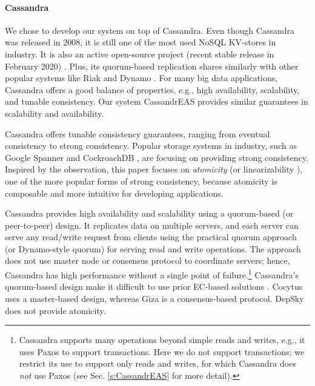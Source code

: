 \paragraph*{Cassandra}

We chose to develop our system on top of Cassandra. Even though Cassandra was released in 2008, it is still one of the most used NoSQL KV-stores in industry. It is also an active open-source project (recent stable release in February 2020) \cite{DBEnginesCassandra}. Plus, its quorum-based replication \cite{pbs-vldb2012} shares similarly with other popular systems like Riak \cite{Riak} and Dynamo \cite{Dynamo}. For many big data applications, Cassandra offers a good balance of properties, e.g., high availability, scalability, and tunable consistency. Our system CassandrEAS provides similar guarantees in scalability and availability.%


Cassandra offers tunable consistency guarantees, ranging from eventual consistency to strong consistency.
Popular storage systems in industry, such as Google Spanner \cite{Spanner} and CockroachDB \cite{cockroachDB}, are focusing on providing strong consistency. 
Inspired by the observation, this paper focuses on \textit{atomicity} \cite{lamport} (or linearizability \cite{herlihy1990linearizability}), one of the more popular forms of strong consistency, because atomicity is composable \cite{herlihy1990linearizability} and more intuitive for developing applications.


Cassandra provides high availability and scalability using a quorum-based (or peer-to-peer) design.
It replicates data on multiple servers, and each server can serve any read/write request from clients 
using the practical quorum approach (or Dynamo-style quorum) \cite{pbs-vldb2012} for serving read and write operations. 
The approach does not use master node or consensus protocol to coordinate servers; hence, Cassandra has high performance without a single point of failure.\footnote{Cassandra  supports many operations beyond simple reads and writes, e.g., it uses Paxos \cite{paxos} to support transactions. Here we do not support transactions; we restrict its use to support only reads and writes, for which Cassandra does \textit{not} use Paxos (see Sec. \ref{s:CassandrEAS} for more detail).}  
Cassandra's quorum-based design make it difficult to use prior EC-based solutions \cite{Cocytus2016,GIZA2017,DepSky13}. Cocytus \cite{Cocytus2016} uses a master-based design, whereas Giza \cite{GIZA2017} is a consensus-based protocol. DepSky  \cite{DepSky13} does not provide atomicity. 

